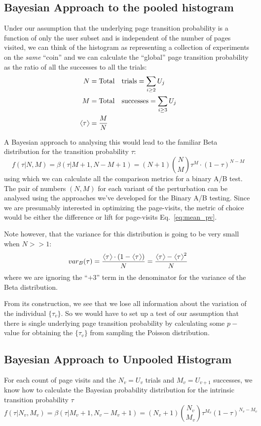\documentclass[12pt]{report}
\newcommand{\beq}{\begin{equation}} %
\newcommand{\eeq}{\end{equation}} %
\newcommand{\bdm}{\begin{displaymath}} %
\newcommand{\edm}{\end{displaymath}} %
\newcommand{\langl}{\begin{picture}(4.5,7)
\put(1.1,2.5){\rotatebox{60}{\line(1,0){5.5}}}
\put(1.1,2.5){\rotatebox{300}{\line(1,0){5.5}}}
\end{picture}}
\newcommand{\rangl}{\begin{picture}(4.5,7)
\put(.9,2.5){\rotatebox{120}{\line(1,0){5.5}}}
\put(.9,2.5){\rotatebox{240}{\line(1,0){5.5}}}
\end{picture}}
\newcommand{\mymean}[1]{\ensuremath{\langl{#1}\rangl}} %
\begin{document}
\subsection{Bayesian Approach to the pooled histogram}\label{sec:BayesPooled}
Under our assumption that the underlying page transition probability
is a function of only the user subset and is independent of the number
of pages visited, we can think of the histogram as representing a
collection of experiments on the {\em same} ``coin'' and we can
calculate the ``global'' page transition probability as the ratio of
all the successes to all the trials:
\beq
\begin{split}
  N &= {\rm Total\quad trials} = \sum_{i\ge 2}U_j\\ 
  M &= {\rm Total\quad successes} = \sum_{i\ge 3}U_j\\
  \mymean{\tau} &= \frac{M}{N}
\end{split}
\eeq

A Bayesian approach to analysing this would lead to the familiar Beta
distribution for the transition probability \(\tau\):
\beq\label{eq:BayesPooled}
f(\tau|N,M)=\beta(\tau|M+1, N-M+1)= (N+1){N\choose M}\tau^M\cdot (1-\tau)^{N-M}
\eeq
using which we can calculate all the comparison metrics for a binary
A/B test. The pair of numbers \((N,M)\) for each variant of the
perturbation can be analysed using the approaches we've developed for
the Binary A/B testing. Since we are presumably interested in
optimizing the page-visits, the metric of choice would be either the
difference or lift for page-visits Eq.~\ref{eq:mean_pv}.

Note however, that the
variance for this distribution is going to be very small when
\(N>>1\):
\bdm
var_B(\tau) = \frac{\mymean{\tau}\cdot(1-\mymean{\tau})}{N}= \frac{\mymean{\tau}- \mymean{\tau}^2}{N}
\edm
where we are ignoring the ``\(+3\)'' term in the denominator for the
variance of the Beta distribution.

From its construction, we see that we lose all information about the
variation of the individual \(\{\tau_v\}\). So we would have to set up
a test of our assumption that there is single underlying page
transition probability by calculating some \(p-\)value for obtaining the
\(\{\tau_v\}\) from sampling the Poisson distribution.

\subsection{Bayesian Approach to Unpooled Histogram}\label{sec:BayesUnpooled}
For each count of page visits and the \(N_v=U_v\) trials and
\(M_v=U_{v+1}\) successes, we know how to calculate the Bayesian
probability distribution for the intrinsic transition probability
\(\tau\)
\beq\label{eq:beta}
f(\tau|N_v,M_v) =\beta(\tau|M_v+1, N_v-M_v+1) = (N_v+1) {N_v\choose M_v}\tau^{M_v} (1-\tau)^{N_v-M_v}
\eeq
\end{document}
